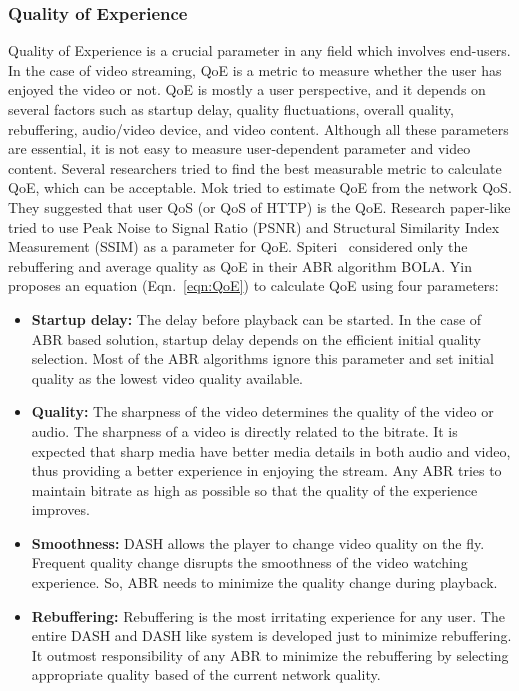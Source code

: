 \subsubsection{Quality of Experience}
Quality of Experience is a crucial parameter in any field which involves end-users. In the case of video streaming, QoE is a metric to measure whether the user has enjoyed the video or not. QoE is mostly a user perspective, and it depends on several factors such as startup delay, quality fluctuations, overall quality, rebuffering, audio/video device, and video content. Although all these parameters are essential, it is not easy to measure user-dependent parameter and video content. Several researchers tried to find the best measurable metric to calculate QoE, which can be acceptable. Mok \etal \cite{5990550} tried to estimate QoE from the network QoS. They suggested that user QoS (or QoS of HTTP) is the QoE. Research paper-like \cite{} tried to use Peak Noise to Signal Ratio (PSNR) and Structural Similarity Index Measurement (SSIM) as a parameter for QoE. Spiteri \etal\ considered only the rebuffering and average quality as QoE in their ABR algorithm BOLA\cite{Spiteri2016}. Yin \etal\cite{yin2015control} proposes an equation (Eqn.~\ref{eqn:QoE}) to calculate QoE using four parameters:
\begin{itemize}
	\item {\bf Startup delay:} The delay before playback can be started. In the case of ABR based solution, startup delay depends on the efficient initial quality selection. Most of the ABR algorithms ignore this parameter and set initial quality as the lowest video quality available.
	\item {\bf Quality:} The sharpness of the video determines the quality of the video or audio. The sharpness of a video is directly related to the bitrate. It is expected that sharp media have better media details in both audio and video, thus providing a better experience in enjoying the stream. Any ABR tries to maintain bitrate as high as possible so that the quality of the experience improves.
	\item {\bf Smoothness:} DASH allows the player to change video quality on the fly. Frequent quality change disrupts the smoothness of the video watching experience. So, ABR needs to minimize the quality change during playback.
	\item {\bf Rebuffering:} Rebuffering is the most irritating experience for any user. The entire DASH and DASH like system is developed just to minimize rebuffering. It outmost responsibility of any ABR to minimize the rebuffering by selecting appropriate quality based of the current network quality.
\end{itemize}
